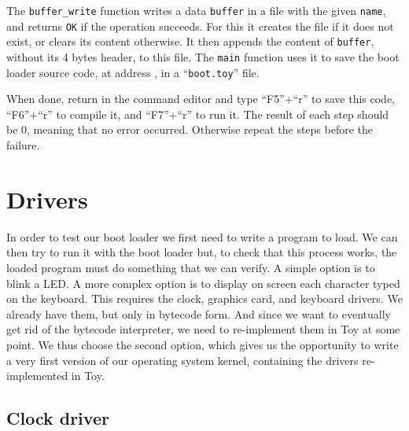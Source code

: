 The {\tt buffer\_write} function writes a data {\tt buffer} in a file with the
given {\tt name}, and returns {\tt OK} if the operation succeeds. For this it
creates the file if it does not exist, or clears its content otherwise. It then
appends the content of {\tt buffer}, without its 4 bytes header, to this file.
The {\tt main} function uses it to save the boot loader source code, at address
, in a ``{\tt boot.toy}'' file.

When done, return in the command editor and type ``F5''+``r'' to save this
code, ``F6''+``r'' to compile it, and ``F7''+``r'' to run it. The result of
each step should be 0, meaning that no error occurred. Otherwise repeat the
steps before the failure.


\section{Drivers}

In order to test our boot loader we first need to write a program to load. We
can then try to run it with the boot loader but, to check that this process
works, the loaded program must do something that we can verify. A simple option
is to blink a LED. A more complex option is to display on screen each character
typed on the keyboard. This requires the clock, graphics card, and keyboard
drivers. We already have them, but only in bytecode form. And since we want to
eventually get rid of the bytecode interpreter, we need to re-implement them in
Toy at some point. We thus choose the second option, which gives us the
opportunity to write a very first version of our operating system kernel,
containing the drivers re-implemented in Toy.


\subsection{Clock driver}

